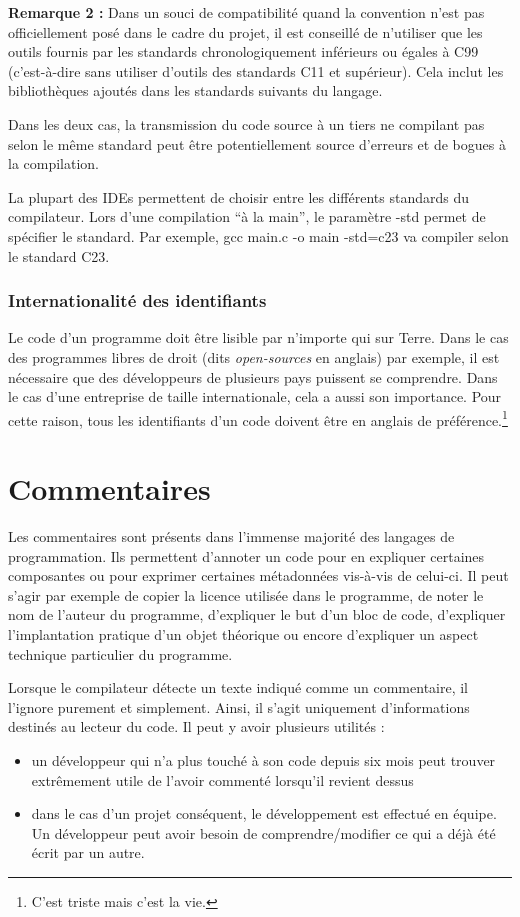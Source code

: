 \documentclass[../../../main.tex]{subfiles}
\begin{document}
\textbf{Remarque 2 :} Dans un souci de compatibilité quand la convention n'est pas officiellement posé dans le cadre du projet, il est conseillé de n'utiliser que les outils fournis par les standards chronologiquement inférieurs ou égales à C99 (c'est-à-dire sans utiliser d'outils des standards C11 et supérieur). Cela inclut les bibliothèques ajoutés dans les standards suivants du langage.
 
Dans les deux cas, la transmission du code source à un tiers ne compilant pas selon le même standard peut être potentiellement source d'erreurs et de bogues à la compilation.
 
La plupart des IDEs permettent de choisir entre les différents standards du compilateur. Lors d'une compilation ``à la main'', le paramètre \textsf{-std} permet de spécifier le standard. Par exemple, \textsf{gcc main.c -o main -std=c23} va compiler selon le standard C23.
 
\subsubsection{Internationalité des identifiants}
 
Le code d'un programme doit être lisible par n'importe qui sur Terre. Dans le cas des programmes libres de droit (dits \textit{open-sources} en anglais) par exemple, il est nécessaire que des développeurs de plusieurs pays puissent se comprendre. Dans le cas d'une entreprise de taille internationale, cela a aussi son importance. Pour cette raison, tous les identifiants d'un code doivent être en anglais de préférence.\footnote{C'est triste mais c'est la vie.}
\section{Commentaires}
Les commentaires sont présents dans l'immense majorité des langages de programmation. Ils permettent d'annoter un code pour en expliquer certaines composantes ou pour exprimer certaines métadonnées vis-à-vis de celui-ci. Il peut s'agir par exemple de copier la licence utilisée dans le programme, de noter le nom de l'auteur du programme, d'expliquer le but d'un bloc de code, d'expliquer l'implantation pratique d'un objet théorique ou encore d'expliquer un aspect technique particulier du programme.
 
Lorsque le compilateur détecte un texte indiqué comme un commentaire, il l'ignore purement et simplement. Ainsi, il s'agit uniquement d'informations destinés au lecteur du code. Il peut y avoir plusieurs utilités :
\begin{itemize}
	\item un développeur qui n'a plus touché à son code depuis six mois peut trouver extrêmement utile de l'avoir commenté lorsqu'il revient dessus
	\item dans le cas d'un projet conséquent, le développement est effectué en équipe. Un développeur peut avoir besoin de comprendre/modifier ce qui a déjà été écrit par un autre.
\end{itemize}
\end{document}
